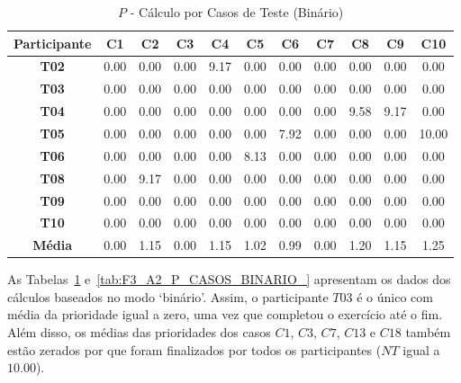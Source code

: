 \begin{table}[htbp]
	\centering
	\caption{$P$ - Cálculo por Casos de Teste (Binário)}
\begin{tabular}{|c|c|c|c|c|c|c|c|c|c|c|}
	\hline
	\rowcolor[HTML]{D9D9D9} 
	\cellcolor[HTML]{D0CECE}\textbf{Participante} & \textbf{C1} & \textbf{C2} & \textbf{C3} & \textbf{C4} & \textbf{C5} & \textbf{C6} & \textbf{C7} & \textbf{C8} & \textbf{C9} & \textbf{C10} \\ \hline
	\textbf{T02} & 0.00 & 0.00 & 0.00 & 9.17 & 0.00 & 0.00 & 0.00 & 0.00 & 0.00 & 0.00 \\ \hline
	\rowcolor[HTML]{F2F2F2} 
	\textbf{T03} & 0.00 & 0.00 & 0.00 & 0.00 & 0.00 & 0.00 & 0.00 & 0.00 & 0.00 & 0.00 \\ \hline
	\textbf{T04} & 0.00 & 0.00 & 0.00 & 0.00 & 0.00 & 0.00 & 0.00 & 9.58 & 9.17 & 0.00 \\ \hline
	\rowcolor[HTML]{F2F2F2} 
	\textbf{T05} & 0.00 & 0.00 & 0.00 & 0.00 & 0.00 & 7.92 & 0.00 & 0.00 & 0.00 & 10.00 \\ \hline
	\textbf{T06} & 0.00 & 0.00 & 0.00 & 0.00 & 8.13 & 0.00 & 0.00 & 0.00 & 0.00 & 0.00 \\ \hline
	\rowcolor[HTML]{F2F2F2} 
	\textbf{T08} & 0.00 & 9.17 & 0.00 & 0.00 & 0.00 & 0.00 & 0.00 & 0.00 & 0.00 & 0.00 \\ \hline
	\textbf{T09} & 0.00 & 0.00 & 0.00 & 0.00 & 0.00 & 0.00 & 0.00 & 0.00 & 0.00 & 0.00 \\ \hline
	\rowcolor[HTML]{F2F2F2} 
	\textbf{T10} & 0.00 & 0.00 & 0.00 & 0.00 & 0.00 & 0.00 & 0.00 & 0.00 & 0.00 & 0.00 \\ \hline
	\rowcolor[HTML]{D0CECE} 
	\textbf{Média} & 0.00 & 1.15 & 0.00 & 1.15 & 1.02 & 0.99 & 0.00 & 1.20 & 1.15 & 1.25 \\ \hline
\end{tabular}
	\label{tab:F3_A2_P_CASOS_BINARIO}
\end{table}

As Tabelas~\ref{tab:F3_A2_P_CASOS_BINARIO} e~\ref{tab:F3_A2_P_CASOS_BINARIO_} apresentam os dados dos cálculos baseados no modo `binário'. Assim, o participante $T03$ é o único com média da prioridade igual a zero, uma vez que completou o exercício até o fim. Além disso, os médias das prioridades dos casos $C1$, $C3$, $C7$, $C13$ e $C18$ também estão zerados por que foram finalizados por todos os participantes ($NT$ igual a $10.00$).

